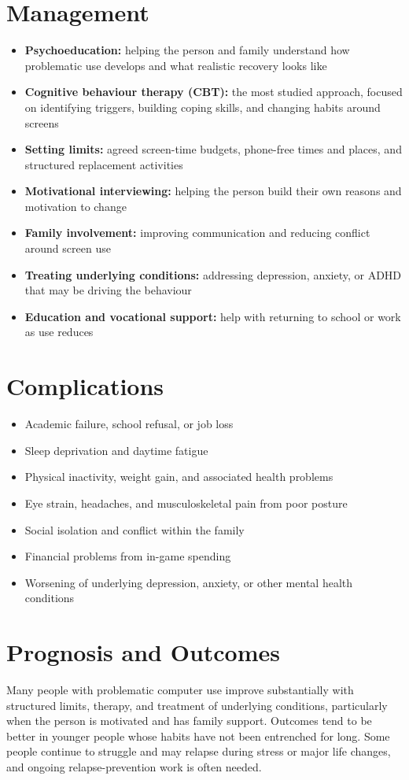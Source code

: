 \section*{Management}
\begin{itemize}
    \item \textbf{Psychoeducation:} helping the person and family understand how problematic use develops and what realistic recovery looks like
    \item \textbf{Cognitive behaviour therapy (CBT):} the most studied approach, focused on identifying triggers, building coping skills, and changing habits around screens
    \item \textbf{Setting limits:} agreed screen-time budgets, phone-free times and places, and structured replacement activities
    \item \textbf{Motivational interviewing:} helping the person build their own reasons and motivation to change
    \item \textbf{Family involvement:} improving communication and reducing conflict around screen use
    \item \textbf{Treating underlying conditions:} addressing depression, anxiety, or ADHD that may be driving the behaviour
    \item \textbf{Education and vocational support:} help with returning to school or work as use reduces
\end{itemize}

\section*{Complications}
\begin{itemize}
    \item Academic failure, school refusal, or job loss
    \item Sleep deprivation and daytime fatigue
    \item Physical inactivity, weight gain, and associated health problems
    \item Eye strain, headaches, and musculoskeletal pain from poor posture
    \item Social isolation and conflict within the family
    \item Financial problems from in-game spending
    \item Worsening of underlying depression, anxiety, or other mental health conditions
\end{itemize}

\section*{Prognosis and Outcomes}
Many people with problematic computer use improve substantially with structured limits, therapy, and treatment of underlying conditions, particularly when the person is motivated and has family support. Outcomes tend to be better in younger people whose habits have not been entrenched for long. Some people continue to struggle and may relapse during stress or major life changes, and ongoing relapse-prevention work is often needed.

